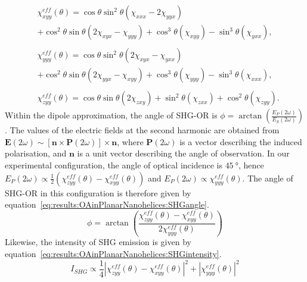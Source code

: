 \begin{equation}\label{eq:results:OAinPlanarNanohelices:ChiEff}
	\begin{split}
		&\chi_{xyy}^{eff}(\theta) = \cos\theta\sin^2\theta(\chi_{xxx} - 2\chi_{yyx}) \\
		&+ {\cos^2}\theta\sin\theta (2\chi _{xyx} - \chi_{yyy}) + {\cos^3}\theta(\chi_{xyy}) - {\sin^3}\theta(\chi _{yxx}), \\
		\\
		&\chi_{yyy}^{eff}(\theta) = \cos\theta\sin^2\theta(2\chi_{xyx} - \chi_{yxx}) \\
		&+ {\cos^2}\theta\sin\theta (2\chi _{yyx} - \chi_{xyy}) + {\cos^3}\theta(\chi_{yyy}) - {\sin^3}\theta(\chi _{xxx}), \\
		\\
		&\chi _{zyy}^{eff}(\theta) = \cos\theta\sin\theta (2\chi_{zxy}) + {\sin^2}\theta(\chi_{zxx}) + {\cos^2}\theta (\chi_{zyy}).
	\end{split}
\end{equation}
Within the dipole approximation, the angle of SHG-OR is $\phi=\arctan{\left(\frac{E_P\left(2\omega\right)}{E_S\left(2\omega\right)}\right)}$. 
The values of the electric fields at the second harmonic are obtained from ${\mathbf{E}(2\omega)\sim[\mathbf{n}\times\mathbf{P}(2\omega)]\times\mathbf{n}}$, where $\mathbf{P}(2\omega)$ is a vector describing the induced polarisation, and $\mathbf{n}$ is a unit vector describing the angle of observation. 
In our experimental configuration, the angle of optical incidence is $\SI{45}{\degree}$, hence $E_P(2\omega)\propto\frac{1}{2}(\chi_{zyy}^{eff}(\theta)-\chi_{xyy}^{eff}(\theta))$ and $E_P(2\omega)\propto\chi_{yyy}^{eff}(\theta)$. 
The angle of SHG-OR in this configuration is therefore given by equation~\ref{eq:results:OAinPlanarNanohelices:SHGangle}.
\begin{equation}\label{eq:results:OAinPlanarNanohelices:SHGangle}
	\phi  = \arctan \left({\frac{\chi_{zyy}^{eff}(\theta) - \chi _{xyy}^{eff}(\theta)}{2\chi _{yyy}^{eff}(\theta)}}\right)
\end{equation}
Likewise, the intensity of SHG emission is given by equation~\ref{eq:results:OAinPlanarNanohelices:SHGintensity}.
\begin{equation}\label{eq:results:OAinPlanarNanohelices:SHGintensity}
	I_{SHG} \propto \frac{1}{4}{\left| {\chi _{zyy}^{eff}\left( \theta  \right) - \chi _{xyy}^{eff}\left( \theta  \right)} \right|^2} + {\left| {\chi _{yyy}^{eff}\left( \theta  \right)} \right|^2}
\end{equation}
